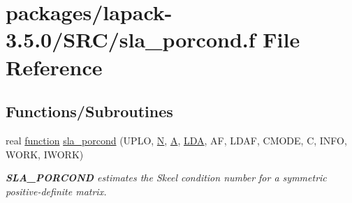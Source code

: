 \hypertarget{sla__porcond_8f}{}\section{packages/lapack-\/3.5.0/\+S\+R\+C/sla\+\_\+porcond.f File Reference}
\label{sla__porcond_8f}
\subsection*{Functions/\+Subroutines}
\begin{DoxyCompactItemize}
\item 
real \hyperlink{afunc_8m_a7b5e596df91eadea6c537c0825e894a7}{function} \hyperlink{group__realPOcomputational_ga8480336dc884c4ec105e02d94875c80c}{sla\+\_\+porcond} (U\+P\+L\+O, \hyperlink{polmisc_8c_a0240ac851181b84ac374872dc5434ee4}{N}, \hyperlink{classA}{A}, \hyperlink{example__user_8c_ae946da542ce0db94dced19b2ecefd1aa}{L\+D\+A}, A\+F, L\+D\+A\+F, C\+M\+O\+D\+E, C, I\+N\+F\+O, W\+O\+R\+K, I\+W\+O\+R\+K)
\begin{DoxyCompactList}\small\item\em {\bfseries S\+L\+A\+\_\+\+P\+O\+R\+C\+O\+N\+D} estimates the Skeel condition number for a symmetric positive-\/definite matrix. \end{DoxyCompactList}\end{DoxyCompactItemize}
